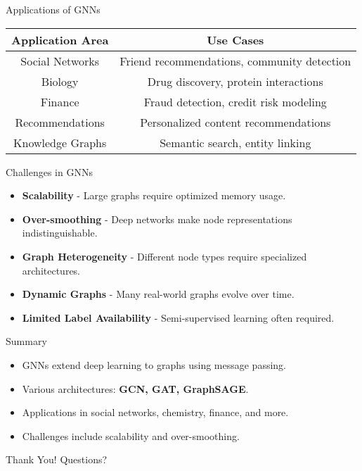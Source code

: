 \documentclass{beamer}
\begin{document}
\begin{frame}{Applications of GNNs}
    \begin{tabular}{|c|c|}
        \hline
        \textbf{Application Area} & \textbf{Use Cases} \\
        \hline
        Social Networks & Friend recommendations, community detection \\
        Biology & Drug discovery, protein interactions \\
        Finance & Fraud detection, credit risk modeling \\
        Recommendations & Personalized content recommendations \\
        Knowledge Graphs & Semantic search, entity linking \\
        \hline
    \end{tabular}
\end{frame}

\begin{frame}{Challenges in GNNs}
    \begin{itemize}
        \item \textbf{Scalability} - Large graphs require optimized memory usage.
        \item \textbf{Over-smoothing} - Deep networks make node representations indistinguishable.
        \item \textbf{Graph Heterogeneity} - Different node types require specialized architectures.
        \item \textbf{Dynamic Graphs} - Many real-world graphs evolve over time.
        \item \textbf{Limited Label Availability} - Semi-supervised learning often required.
    \end{itemize}
\end{frame}

\begin{frame}{Summary}
    \begin{itemize}
        \item GNNs extend deep learning to graphs using message passing.
        \item Various architectures: \textbf{GCN, GAT, GraphSAGE}.
        \item Applications in social networks, chemistry, finance, and more.
        \item Challenges include scalability and over-smoothing.
    \end{itemize}
\end{frame}

\begin{frame}{Thank You!}
    \centering
    Questions?
\end{frame}
\end{document}
